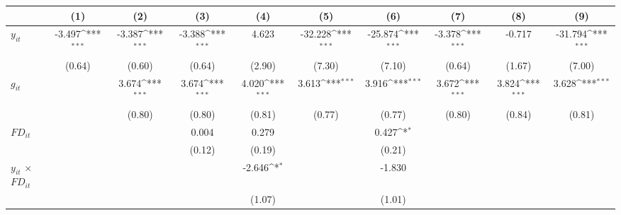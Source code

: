 \documentclass[12pt, a4paper]{article}
\begin{document}
\begin{table}[htbp]
	\centering
	\setlength\tabcolsep{1pt}	
	\begin{threeparttable}
		{\scriptsize
			\def\sym#1{\ifmmode^{#1}\else\(^{#1}\)\fi}
			\begin{tabular}{l*{9}{c}}
				\hline\hline
				&\multicolumn{1}{c}{(1)}&\multicolumn{1}{c}{(2)}&\multicolumn{1}{c}{(3)}&\multicolumn{1}{c}{(4)}&\multicolumn{1}{c}{(5)}&\multicolumn{1}{c}{(6)}&\multicolumn{1}{c}{(7)}&\multicolumn{1}{c}{(8)}&\multicolumn{1}{c}{(9)}\\
				\hline
				$y_{it}$       &      -3.497\sym{***}&      -3.387\sym{***}&      -3.388\sym{***}&       4.623         &     -32.228\sym{***}&     -25.874\sym{***}&      -3.378\sym{***}&      -0.717         &     -31.794\sym{***}\\
				&      (0.64)         &      (0.60)         &      (0.64)         &      (2.90)         &      (7.30)         &      (7.10)         &      (0.64)         &      (1.67)         &      (7.00)         \\
				$g_{it}$            &                     &       3.674\sym{***}&       3.674\sym{***}&       4.020\sym{***}&       3.613\sym{***}&       3.916\sym{***}&       3.672\sym{***}&       3.824\sym{***}&       3.628\sym{***}\\
				&                     &      (0.80)         &      (0.80)         &      (0.81)         &      (0.77)         &      (0.77)         &      (0.80)         &      (0.84)         &      (0.81)         \\
				$FD_{it}$                &                     &                     &       0.004         &       0.279         &                     &       0.427\sym{*}  &                     &                     &                     \\
				&                     &                     &      (0.12)         &      (0.19)         &                     &      (0.21)         &                     &                     &                     \\
				$y_{it}$ $\times$ $FD_{it}$ &                     &                     &                     &      -2.646\sym{*}  &                     &      -1.830         &                     &                     &                     \\
				&                     &                     &                     &      (1.07)         &                     &      (1.01)         &                     &                     &                     \\

\end{tabular}}
\end{threeparttable}
\end{table}
\end{document}
